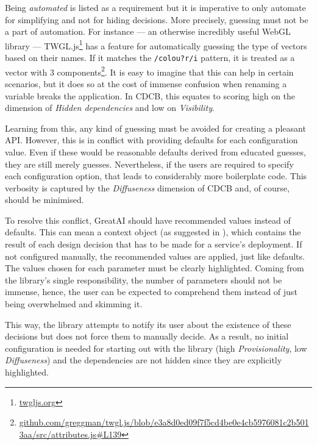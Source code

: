 Being \textit{automated} is listed as a requirement but it is imperative to only automate for simplifying and not for hiding decisions. More precisely, guessing must not be a part of automation. For instance --- an otherwise incredibly useful WebGL library --- TWGL.js\footnote{\href{https://twgljs.org/}{twgljs.org}} has a feature for automatically guessing the type of vectors based on their names. If it matches the \texttt{/colou?r/i} pattern, it is treated as a vector with 3 components\footnote{\href{https://github.com/greggman/twgl.js/blob/e3a8d0ed09f7f5cd4be0e4cb5976081c2b5013aa/src/attributes.js\#L139}{\tiny github.com/greggman/twgl.js/blob/e3a8d0ed09f7f5cd4be0e4cb5976081c2b5013aa/src/attributes.js\#L139}}. It is easy to imagine that this can help in certain scenarios, but it does so at the cost of immense confusion when renaming a variable breaks the application. In CDCB, this equates to scoring high on the dimension of \textit{Hidden dependencies} and low on \textit{Visibility}.

Learning from this, any kind of guessing must be avoided for creating a pleasant API. However, this is in conflict with providing defaults for each configuration value. Even if these would be reasonable defaults derived from educated guesses, they are still merely guesses. Nevertheless, if the users are required to specify each configuration option, that leads to considerably more boilerplate code. This verbosity is captured by the \textit{Diffuseness} dimension of CDCB and, of course, should be minimised.

To resolve this conflict, GreatAI should have recommended values instead of defaults. This can mean a context object (as suggested in \cite{ousterhout2018philosophy}), which contains the result of each design decision that has to be made for a service's deployment. If not configured manually, the recommended values are applied, just like defaults. The values chosen for each parameter must be clearly highlighted. Coming from the library's single responsibility, the number of parameters should not be immense, hence, the user can be expected to comprehend them instead of just being overwhelmed and skimming it.

This way, the library attempts to notify its user about the existence of these decisions but does not force them to manually decide. As a result, no initial configuration is needed for starting out with the library (high \textit{Provisionality}, low \textit{Diffuseness}) and the dependencies are not hidden since they are explicitly highlighted.

